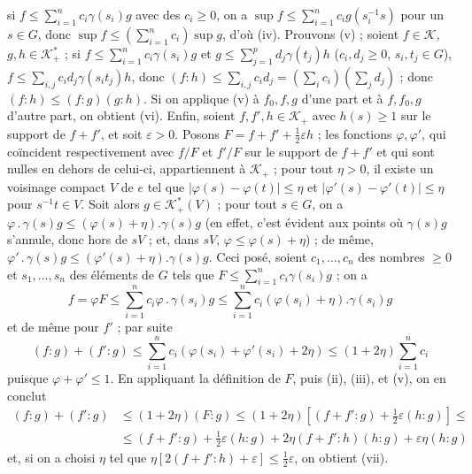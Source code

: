 si $f\leq\sum_{i=1}^n c_i\gamma(s_i)g$ avec des $c_i\geq0$, on a $\sup f\leq\sum_{i=1}^n c_i g(s_i^{-1}s)$ pour un $s\in G$, donc $\sup f\leq(\sum_{i=1}^n c_i)\sup g$, d'où (iv). Prouvons (v) ; soient $f\in\mathcal K$, $g,h\in\mathcal K^*_+$ ; si $f\leq\sum_{i=1}^n c_i\gamma(s_i)g$ et $g\leq\sum_{j=1}^p d_j\gamma(t_j)h$ ($c_i,d_j\geq0$, $s_i,t_j\in G$), $f\leq\sum_{i,j}c_i d_j\gamma(s_it_j)h$, donc $(f:h)\leq\sum_{i,j}c_i d_j=(\sum_i c_i)(\sum_j d_j)$ ; donc $(f:h)\leq(f:g)(g:h)$. Si on applique (v) à $f_0,f,g$ d'une part et à $f,f_0,g$ d'autre part, on obtient (vi). Enfin, soient $f,f',h\in\mathcal K_+$ avec $h(s)\geq1$ sur le support de $f+f'$, et soit $\varepsilon>0$. Posons $F=f+f'+\frac12\varepsilon h$ ; les fonctions $\varphi,\varphi'$, qui coïncident respectivement avec $f/F$ et $f'/F$ sur le support de $f+f'$ et qui sont nulles en dehors de celui-ci, appartiennent à $\mathcal K_+$ ; pour tout $\eta>0$, il existe un voisinage compact $V$ de $e$ tel que $|\varphi(s)-\varphi(t)|\leq\eta$ et $|\varphi'(s)-\varphi'(t)|\leq\eta$ pour $s^{-1}t\in V$. Soit alors $g\in\mathcal K^*_+(V)$ ; pour tout $s\in G$, on a $\varphi\mathbin{.}\gamma(s)g\leq(\varphi(s)+\eta).\gamma(s)g$ (en effet, c'est évident aux points où $\gamma(s)g$ s'annule, donc hors de $sV$ ; et, dans $sV$, $\varphi\leq\varphi(s)+\eta$) ; de même, $\varphi'\mathbin{.}\gamma(s)g\leq(\varphi'(s)+\eta).\gamma(s)g$. Ceci posé, soient $c_1,\ldots,c_n$ des nombres $\geq0$ et $s_1,\ldots,s_n$ des éléments de $G$ tels que $F\leq\sum_{i=1}^n c_i\gamma(s_i)g$ ; on a
\[
f=\varphi F\leq\sum_{i=1}^n c_i\varphi\mathbin{.}\gamma(s_i)g\leq\sum_{i=1}^n c_i(\varphi(s_i)+\eta).\gamma(s_i)g
\]
et de même pour $f'$ ; par suite
\[
(f:g)+(f':g)\leq\sum_{i=1}^n c_i(\varphi(s_i)+\varphi'(s_i)+2\eta)\leq(1+2\eta)\sum_{i=1}^n c_i
\]
puisque $\varphi+\varphi'\leq1$. En appliquant la définition de $F$, puis (ii), (iii), et (v), on en conclut
\[
\begin{aligned}
(f:g)+(f':g)&\leq(1+2\eta)(F:g)\leq(1+2\eta)\left[(f+f':g)+\frac12\varepsilon(h:g)\right]\leq\\
&\leq(f+f':g)+\frac12\varepsilon(h:g)+2\eta(f+f':h)(h:g)+\varepsilon\eta(h:g)
\end{aligned}
\]
et, si on a choisi $\eta$ tel que $\eta[2(f+f':h)+\varepsilon]\leq\frac12\varepsilon$, on obtient (vii).

